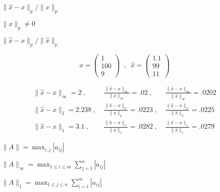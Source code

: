{\newpage\clearpage
{}%
$\| \hat{x} - x \|_{p} / \| x \|_{p}$%
\lthtmlinlinemathZ
\lthtmlcheckvsize\clearpage}

{\newpage\clearpage
{}%
$\| x \|_{p} \neq 0$%
\lthtmlinlinemathZ
\lthtmlcheckvsize\clearpage}

{\newpage\clearpage
{}%
$\| \hat{x} - x \|_{p} / \| \hat{x} \|_{p}$%
\lthtmlinlinemathZ
\lthtmlcheckvsize\clearpage}

{\newpage\clearpage
{}%
\begin{displaymath}
x = \left( \begin{array}{c} 1 \\100 \\9 \end{array} \right) \; \; , \; \;
\hat{x} = \left( \begin{array}{c} 1.1 \\99 \\11 \end{array} \right) 
\end{displaymath}%
\lthtmldisplayZ
\lthtmlcheckvsize\clearpage}

{\newpage\clearpage
{}%
\begin{eqnarray*}
\| \hat{x} - x \|_{\infty} = 2 \; , \;  & \displaystyle{
\frac{\| \hat{x} - x \|_{\infty}}{\| x \|_{\infty}} = .02 }  \; , \; &
\frac{\| \hat{x} - x \|_{\infty}}{\| \hat{x} \|_{\infty}} = .0202  \\
\| \hat{x} - x \|_{2} = 2.238  \; , \;  & \displaystyle{
\frac{\| \hat{x} - x \|_{2}}{\| x \|_{2}} = .0223 }  \; , \; &
\frac{\| \hat{x} - x \|_{2}}{\| \hat{x} \|_{2}} = .0225  \\
\| \hat{x} - x \|_{1} = 3.1  \; , \; & \displaystyle{
\frac{\| \hat{x} - x \|_{1}}{\| x \|_{1}} = .0282 }  \; , \; &
\frac{\| \hat{x} - x \|_{1}}{\| \hat{x} \|_{1}} = .0279
\end{eqnarray*}%
\lthtmldisplayZ
\lthtmlcheckvsize\clearpage}

{\newpage\clearpage
{}%
$\| A \| = \max_{i,j} |a_{ij}|$%
\lthtmlinlinemathZ
\lthtmlcheckvsize\clearpage}

{\newpage\clearpage
{}%
$\| A \|_{\infty} = \max_{1 \leq i \leq m} \sum_{j=1}^n |a_{ij}|$%
\lthtmlinlinemathZ
\lthtmlcheckvsize\clearpage}

{\newpage\clearpage
{}%
$\| A \|_{1} = \max_{1 \leq j \leq n} \sum_{i=1}^m |a_{ij}|$%
\lthtmlinlinemathZ
\lthtmlcheckvsize\clearpage}

